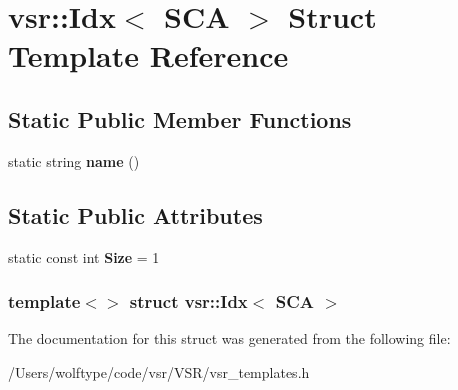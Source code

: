\hypertarget{structvsr_1_1_idx_3_01_s_c_a_01_4}{\section{vsr\-:\-:Idx$<$ S\-C\-A $>$ Struct Template Reference}
\label{structvsr_1_1_idx_3_01_s_c_a_01_4}
}
\subsection*{Static Public Member Functions}
\begin{DoxyCompactItemize}
\item 
\hypertarget{structvsr_1_1_idx_3_01_s_c_a_01_4_aa4cf1678ff6c9729b35f6e171da76dfc}{static string {\bfseries name} ()}\label{structvsr_1_1_idx_3_01_s_c_a_01_4_aa4cf1678ff6c9729b35f6e171da76dfc}

\end{DoxyCompactItemize}
\subsection*{Static Public Attributes}
\begin{DoxyCompactItemize}
\item 
\hypertarget{structvsr_1_1_idx_3_01_s_c_a_01_4_af753ea136e9a1466de0d1c5ab0b1addd}{static const int {\bfseries Size} = 1}\label{structvsr_1_1_idx_3_01_s_c_a_01_4_af753ea136e9a1466de0d1c5ab0b1addd}

\end{DoxyCompactItemize}
\subsubsection*{template$<$$>$ struct vsr\-::\-Idx$<$ S\-C\-A $>$}



The documentation for this struct was generated from the following file\-:\begin{DoxyCompactItemize}
\item 
/\-Users/wolftype/code/vsr/\-V\-S\-R/vsr\-\_\-templates.\-h\end{DoxyCompactItemize}
